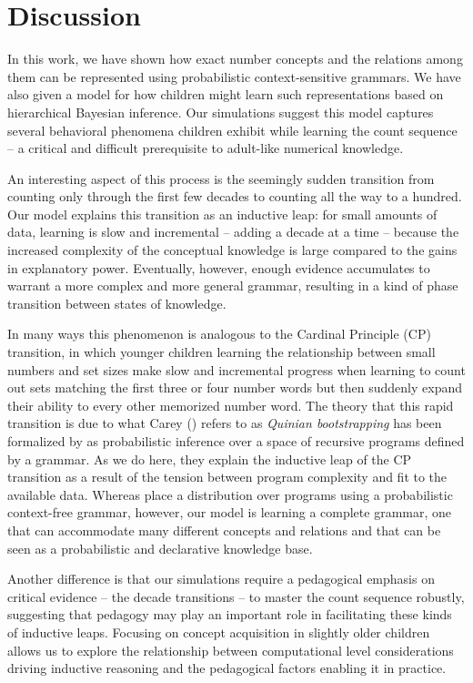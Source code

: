 \documentclass[10pt,letterpaper]{article}
\begin{document}
\section{Discussion}

In this work, we have shown how exact number concepts and the
relations among them can be represented using probabilistic
context-sensitive grammars. We have also given a model for how
children might learn such representations based on hierarchical
Bayesian inference. Our simulations suggest this model captures
several behavioral phenomena children exhibit while learning the count
sequence -- a critical and difficult prerequisite to adult-like
numerical knowledge.

An interesting aspect of this process is the seemingly sudden
transition from counting only through the first few decades to
counting all the way to a hundred. Our model explains this transition
as an inductive leap: for small amounts of data, learning is slow and
incremental -- adding a decade at a time -- because the increased
complexity of the conceptual knowledge is large compared to the gains
in explanatory power. Eventually, however, enough evidence accumulates
to warrant a more complex and more general grammar, resulting
in a kind of phase transition between states of knowledge.

In many ways this phenomenon is analogous to the Cardinal Principle
(CP) transition, in which younger children learning the relationship
between small numbers and set sizes make slow and incremental progress
when learning to count out sets matching the first three or four
number words but then suddenly expand their ability to every other
memorized number word. The theory that this rapid transition is due to
what Carey (\citeyear{Car2009}) refers to as \emph{Quinian
  bootstrapping} has been formalized by \citet{PianGoodTen2012} as
probabilistic inference over a space of recursive programs defined by
a grammar. As we do here, they explain the inductive leap of the CP
transition as a result of the tension between program complexity and
fit to the available data. Whereas \citeauthor{PianGoodTen2012} place
a distribution over programs using a probabilistic context-free
grammar, however, our model is learning a complete grammar, one that
can accommodate many different concepts and relations and that can be
seen as a probabilistic and declarative knowledge base.

Another difference is that our simulations require a pedagogical
emphasis on critical evidence -- the decade transitions -- to master
the count sequence robustly, suggesting that pedagogy may play an
important role in facilitating these kinds of inductive leaps.
Focusing on concept acquisition in slightly older children allows us
to explore the relationship between computational level considerations
driving inductive reasoning and the pedagogical factors enabling it in
practice.
\end{document}
